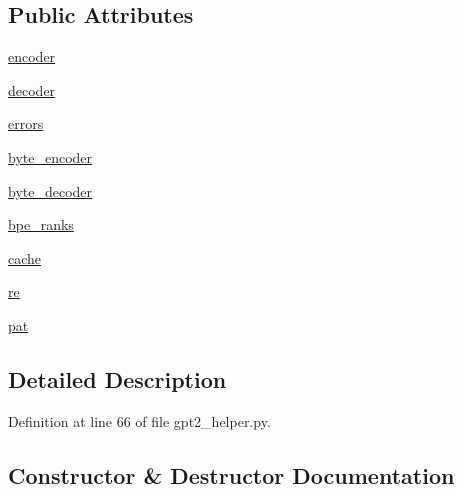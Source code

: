 \subsection*{Public Attributes}
\begin{DoxyCompactItemize}
\item 
\hyperlink{classparlai_1_1core_1_1gpt2__helper_1_1Gpt2BpeHelper_a794ff2b9372acac9ab7c80b5c07ab60b}{encoder}
\item 
\hyperlink{classparlai_1_1core_1_1gpt2__helper_1_1Gpt2BpeHelper_a26ab20eb1b181e46035f2164513d8fce}{decoder}
\item 
\hyperlink{classparlai_1_1core_1_1gpt2__helper_1_1Gpt2BpeHelper_a0ea9f7588f25a62eb6021a54ea8ca095}{errors}
\item 
\hyperlink{classparlai_1_1core_1_1gpt2__helper_1_1Gpt2BpeHelper_aa05888129c3d12eec57bc03e92390e4c}{byte\+\_\+encoder}
\item 
\hyperlink{classparlai_1_1core_1_1gpt2__helper_1_1Gpt2BpeHelper_aaa6f9b57563422f3651ee240013ae9f4}{byte\+\_\+decoder}
\item 
\hyperlink{classparlai_1_1core_1_1gpt2__helper_1_1Gpt2BpeHelper_a3138a0a7614de78ee773642fbe6ddaae}{bpe\+\_\+ranks}
\item 
\hyperlink{classparlai_1_1core_1_1gpt2__helper_1_1Gpt2BpeHelper_a9362e804fcdf0565a640996285e85689}{cache}
\item 
\hyperlink{classparlai_1_1core_1_1gpt2__helper_1_1Gpt2BpeHelper_ac1ad446c51c26831655244d83350589a}{re}
\item 
\hyperlink{classparlai_1_1core_1_1gpt2__helper_1_1Gpt2BpeHelper_afbdbf5259b69f21f389eecaaada838d8}{pat}
\end{DoxyCompactItemize}


\subsection{Detailed Description}


Definition at line 66 of file gpt2\+\_\+helper.\+py.



\subsection{Constructor \& Destructor Documentation}
\mbox{\label{classparlai_1_1core_1_1gpt2__helper_1_1Gpt2BpeHelper_a5c9324bab66b00f6f977aef0241927bd}} 
